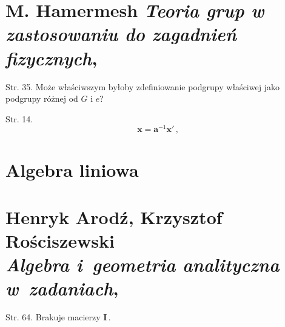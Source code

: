 \documentclass[a4paper,11pt]{article}
\numberwithin{equation}{section}
\begin{document}










\newpage

\section{M. Hamermesh \textit{Teoria grup w zastosowaniu do zagadnień fizycznych}, \cite{}}



Str. 35. Może właściwszym byłoby zdefiniowanie podgrupy
  właściwej jako podgrupy różnej od $G$ i $e$?

Str. 14.
$$ \mathbf{ x } = \mathbf{ a }^{ -1 } \mathbf{ x }' \, ,$$


\VerSpaceTwo












\newpage

\section{Algebra liniowa}

\VerSpaceTwo



\section{ %
  Henryk Arodź, Krzysztof Rościszewski \\
  \textit{Algebra i~geometria analityczna w~zadaniach}, \cite{}}

\vspace{0em}



\vspace{0em}


Str. 64. Brakuje macierzy $\mathbf{I} \, .$





\newpage
\end{document}
